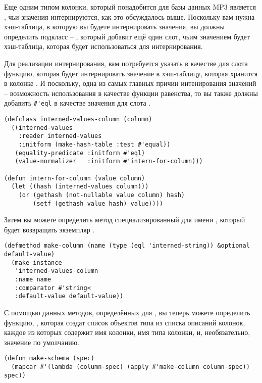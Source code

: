 Еще одним типом колонки, который понадобится для базы данных MP3 является
, чьи значения интернируются, как это обсуждалось выше.  Поскольку
вам нужна хэш-таблица, в которую вы будете интернировать значения, вы должны определить
подкласс  -- , который добавит ещё один слот,
чьим значением будет хэш-таблица, которая будет использоваться для интернирования.

Для реализации интернирования, вам потребуется указать в качестве  для
слота  функцию, которая будет интернировать значение в хэш-таблицу,
которая хранится в колонке .  И поскольку, одна из самых главных
причин интенирования значений -- возможность использования  в качестве функции
равенства, то вы также должны добавить \lstinline!#'eql! в качестве значения 
для слота .

\begin{lstlisting}
(defclass interned-values-column (column)
  ((interned-values
    :reader interned-values
    :initform (make-hash-table :test #'equal))
   (equality-predicate :initform #'eql)
   (value-normalizer   :initform #'intern-for-column)))

(defun intern-for-column (value column)
  (let ((hash (interned-values column)))
    (or (gethash (not-nullable value column) hash)
        (setf (gethash value hash) value))))
\end{lstlisting}

Затем вы можете определить метод  специализированный для имени
, который будет возвращать экземпляр .

\begin{lstlisting}
(defmethod make-column (name (type (eql 'interned-string)) &optional default-value)
  (make-instance 
   'interned-values-column
   :name name
   :comparator #'string< 
   :default-value default-value))
\end{lstlisting}

С помощью данных методов, определённых для , вы теперь можете определить
функцию, , которая создат список объектов типа  из списка
описаний колонок, каждое из которых содержит имя колонки, имя типа колонки, и,
необязательно, значение по умолчанию.

\begin{lstlisting}
(defun make-schema (spec)
  (mapcar #'(lambda (column-spec) (apply #'make-column column-spec)) spec))
\end{lstlisting}

